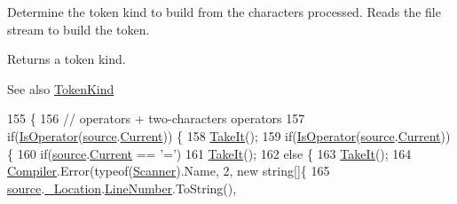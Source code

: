 Determine the token kind to build from the characters processed. Reads the file stream to build the token. \begin{DoxyReturn}{Returns}
a token kind. 
\end{DoxyReturn}
\begin{DoxySeeAlso}{See also}
\mbox{\hyperlink{namespace_compiler_a57929962f25004759596fc3f13cf563c}{Token\+Kind}} 
\end{DoxySeeAlso}

\begin{DoxyCode}
155                                               \{
156                     \textcolor{comment}{// operators + two-characters operators}
157                     \textcolor{keywordflow}{if}(\mbox{\hyperlink{class_compiler_1_1_scanner_afbd70f210f32a803266e042bfe13e58b}{IsOperator}}(\mbox{\hyperlink{class_compiler_1_1_scanner_a6fa17eef62c3cf43853464ccfbd61966}{source}}.\mbox{\hyperlink{class_compiler_1_1_source_file_a4a0d8f66b3c7de70edadb1761aaf65b5}{Current}})) \{
158                         \mbox{\hyperlink{class_compiler_1_1_scanner_af112ca8e7a48e769ab142b1fbb4d8802}{TakeIt}}();
159                         \textcolor{keywordflow}{if}(\mbox{\hyperlink{class_compiler_1_1_scanner_afbd70f210f32a803266e042bfe13e58b}{IsOperator}}(\mbox{\hyperlink{class_compiler_1_1_scanner_a6fa17eef62c3cf43853464ccfbd61966}{source}}.\mbox{\hyperlink{class_compiler_1_1_source_file_a4a0d8f66b3c7de70edadb1761aaf65b5}{Current}})) \{
160                             \textcolor{keywordflow}{if}(\mbox{\hyperlink{class_compiler_1_1_scanner_a6fa17eef62c3cf43853464ccfbd61966}{source}}.\mbox{\hyperlink{class_compiler_1_1_source_file_a4a0d8f66b3c7de70edadb1761aaf65b5}{Current}} == \textcolor{charliteral}{'='})
161                                 \mbox{\hyperlink{class_compiler_1_1_scanner_af112ca8e7a48e769ab142b1fbb4d8802}{TakeIt}}();
162                             \textcolor{keywordflow}{else} \{
163                                 \mbox{\hyperlink{class_compiler_1_1_scanner_af112ca8e7a48e769ab142b1fbb4d8802}{TakeIt}}();
164                                 \mbox{\hyperlink{namespace_compiler}{Compiler}}.Error(typeof(\mbox{\hyperlink{class_compiler_1_1_scanner_a1b80cbd150fb8fdb87f6b31c9d2ddc48}{Scanner}}).Name, 2, \textcolor{keyword}{new} \textcolor{keywordtype}{string}[]\{
165                                     \mbox{\hyperlink{class_compiler_1_1_scanner_a6fa17eef62c3cf43853464ccfbd61966}{source}}.\mbox{\hyperlink{class_compiler_1_1_source_file_a9f6feacf9e20b5b1d535c712d9b4370e}{\_Location}}.\mbox{\hyperlink{class_compiler_1_1_location_a71feb3bfd70af6096dc48451765ba284}{LineNumber}}.ToString(),

\end{DoxyCode}
